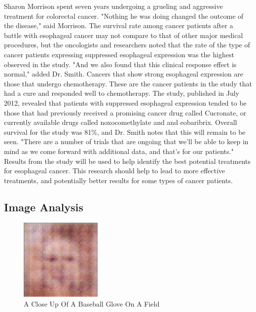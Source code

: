 \documentclass{article}%
\begin{document}
Sharon Morrison spent seven years undergoing a grueling and aggressive treatment for colorectal cancer.\newline%
"Nothing he was doing changed the outcome of the disease," said Morrison.\newline%
The survival rate among cancer patients after a battle with esophageal cancer may not compare to that of other major medical procedures, but the oncologists and researchers noted that the rate of the type of cancer patients expressing suppressed esophageal expression was the highest observed in the study.\newline%
"And we also found that this clinical response effect is normal," added Dr. Smith.\newline%
Cancers that show strong esophageal expression are those that undergo chemotherapy. These are the cancer patients in the study that had a cure and responded well to chemotherapy.\newline%
The study, published in July 2012, revealed that patients with suppressed esophageal expression tended to be those that had previously received a promising cancer drug called Cucronate, or currently available drugs called noxocomethylate and and eobaribrix.\newline%
Overall survival for the study was 81\%, and Dr. Smith notes that this will remain to be seen.\newline%
"There are a number of trials that are ongoing that we'll be able to keep in mind as we come forward with additional data, and that's for our patients."\newline%
Results from the study will be used to help identify the best potential treatments for esophageal cancer.\newline%
This research should help to lead to more effective treatments, and potentially better results for some types of cancer patients.

%
\subsection{Image Analysis}%
\label{subsec:ImageAnalysis}%


\begin{figure}[h!]%
\centering%
\includegraphics[width=150px]{500_fake_images/samples_5_489.png}%
\caption{A Close Up Of A Baseball Glove On A Field}%
\end{figure}

%
\end{document}
